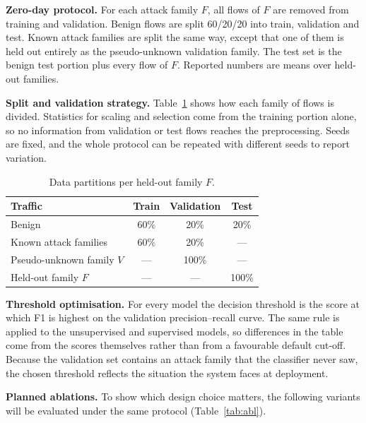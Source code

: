 \documentclass[conference]{IEEEtran}
\begin{document}
\textbf{Zero-day protocol.} For each attack family $F$, all flows of $F$ are removed from training and validation. Benign flows are split 60/20/20 into train, validation and test. Known attack families are split the same way, except that one of them is held out entirely as the pseudo-unknown validation family. The test set is the benign test portion plus every flow of $F$. Reported numbers are means over held-out families.

\textbf{Split and validation strategy.} Table~\ref{tab:split} shows how each family of flows is divided. Statistics for scaling and selection come from the training portion alone, so no information from validation or test flows reaches the preprocessing. Seeds are fixed, and the whole protocol can be repeated with different seeds to report variation.

\begin{table}[!htb]
\caption{Data partitions per held-out family $F$.}
\label{tab:split}
\centering\footnotesize
\begin{tabular}{@{}p{2.4cm}ccc@{}}
\hline
Traffic & Train & Validation & Test \\
\hline
Benign & 60\% & 20\% & 20\% \\
Known attack families & 60\% & 20\% & --- \\
Pseudo-unknown family $V$ & --- & 100\% & --- \\
Held-out family $F$ & --- & --- & 100\% \\
\hline
\end{tabular}
\end{table}

\textbf{Threshold optimisation.} For every model the decision threshold is the score at which F1 is highest on the validation precision--recall curve. The same rule is applied to the unsupervised and supervised models, so differences in the table come from the scores themselves rather than from a favourable default cut-off. Because the validation set contains an attack family that the classifier never saw, the chosen threshold reflects the situation the system faces at deployment.

\textbf{Planned ablations.} To show which design choice matters, the following variants will be evaluated under the same protocol (Table~\ref{tab:abl}).
\end{document}
